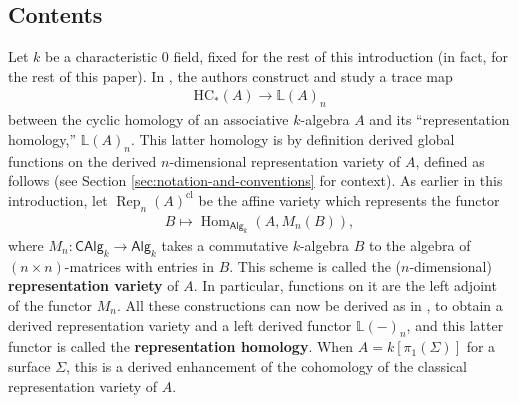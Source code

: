 \documentclass{article}
\numberwithin{equation}{section}
\theoremstyle{quest}
\theoremstyle{definition}
\theoremstyle{remark}
\DeclareMathOperator{\Hom}{Hom}
\DeclareMathOperator{\Rep}{Rep}
\begin{document}
\subsection{Contents}
Let $k$ be a characteristic 0 field, fixed for the rest of this introduction (in fact, for the rest of this paper). In \cite{BKR}, the authors construct and study a trace map 
\begin{align*}
	\mathrm H\mathrm C_*(A)\to \mathbb{L}(A)_n
\end{align*} 
between the cyclic homology of an associative $k$-algebra $A$ and its ``representation homology,'' $\mathbb{L}(A)_n$. This latter homology is by definition derived global functions on the derived $n$-dimensional representation variety of $A$, defined as follows (see Section \ref{sec:notation-and-conventions} for context). As earlier in this introduction, let $\Rep_n(A)^{\text{cl}}$ be the affine variety which represents the functor
\begin{align*}
	B\mapsto \Hom_{\mathsf{Alg}_k}(A,M_n(B)),
\end{align*} 
where $M_n:\mathsf{CAlg}_k\to \mathsf{Alg}_k$ takes a commutative $k$-algebra $B$ to the algebra of $(n\times n)$-matrices with entries in $B$. This scheme is called the ($n$-dimensional) \textbf{representation variety} of $A$. In particular, functions on it are the left adjoint of the functor $M_n$. All these constructions can now be derived as in \cite{BKR}, to obtain a derived representation variety and a left derived functor $\mathbb{L}(-)_n$, and this latter functor is called the \textbf{representation homology}. When $A=k[\pi_1(\Sigma)]$ for a surface $\Sigma$, this is a derived enhancement of the cohomology of the classical representation variety of $A$.
\end{document}
